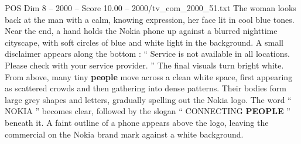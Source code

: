 \begin{textsample}{POS Dim 8 – 2000 – Score 10.00 – 2000/tv\_com\_2000\_51.txt}
The woman looks back at the man with a calm, knowing expression, her face lit in cool blue tones.
Near the end, a hand holds the Nokia phone up against a blurred nighttime cityscape, with soft circles of blue and white light in the background.
A small disclaimer appears along the bottom : “ Service is not available in all locations.
Please check with your service provider. ” The final visuals turn bright white.
From above, many tiny \textbf{people} move across a clean white space, first appearing as scattered crowds and then gathering into dense patterns.
Their bodies form large grey shapes and letters, gradually spelling out the Nokia logo.
The word “ NOKIA ” becomes clear, followed by the slogan “ CONNECTING \textbf{PEOPLE} ” beneath it.
A faint outline of a phone appears above the logo, leaving the commercial on the Nokia brand mark against a white background.

\end{textsample}

